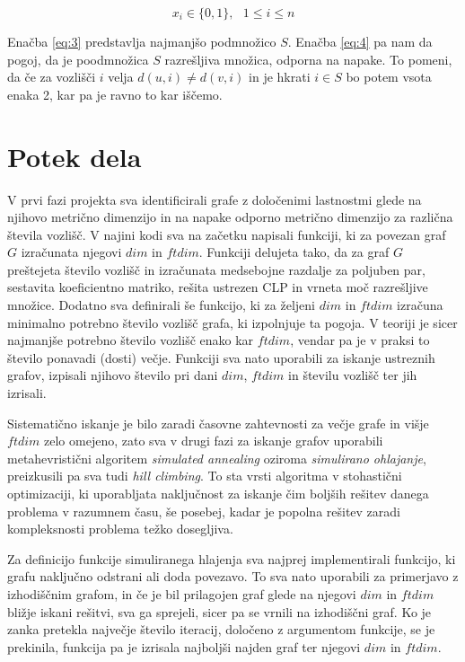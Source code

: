 \documentclass[12pt]{article}
\begin{document}
\begin{equation}
    x_i \in \{0, 1\}, \text{ } 1 \leq i \leq n
\label{eq:5}
\end{equation}

Enačba \eqref{eq:3} predstavlja najmanjšo podmnožico $S.$ Enačba \eqref{eq:4} pa nam da pogoj, da
je poodmnožica $S$ razrešljiva množica, odporna na napake. To pomeni, da če za vozlišči $i$ velja 
$d(u, i) \neq d(v, i)$ in je hkrati $i \in S$ bo potem vsota enaka 2, kar pa je ravno to kar iščemo.

\section{Potek dela}

V prvi fazi projekta sva identificirali grafe z določenimi lastnostmi glede na njihovo metrično 
dimenzijo in na napake odporno metrično dimenzijo za različna števila vozlišč. V najini kodi sva 
na začetku napisali funkciji, ki za povezan graf $G$ izračunata njegovi $dim$ in $ftdim$. Funkciji 
delujeta tako, da za graf $G$ preštejeta število vozlišč in izračunata medsebojne razdalje za poljuben 
par, sestavita koeficientno matriko, rešita ustrezen CLP in vrneta moč razrešljive množice. Dodatno 
sva definirali še funkcijo, ki za željeni $dim$ in $ftdim$ izračuna minimalno potrebno število 
vozlišč grafa, ki izpolnjuje ta pogoja. V teoriji je sicer najmanjše potrebno število vozlišč enako 
kar $ftdim$, vendar pa je v praksi to število ponavadi (dosti) večje. Funkciji sva nato uporabili za 
iskanje ustreznih grafov, izpisali njihovo število pri dani $dim$, $ftdim$ in številu vozlišč ter jih 
izrisali.

Sistematično iskanje je bilo zaradi časovne zahtevnosti za večje grafe in višje $ftdim$ zelo omejeno, 
zato sva v drugi fazi za iskanje grafov uporabili metahevristični algoritem \textit{simulated annealing} 
oziroma \textit{simulirano ohlajanje}, preizkusili pa sva tudi \textit{hill climbing}. To sta vrsti 
algoritma v stohastični optimizaciji, ki uporabljata naključnost za iskanje čim boljših rešitev danega 
problema v razumnem času, še posebej, kadar je popolna rešitev zaradi kompleksnosti problema težko dosegljiva. 

Za definicijo funkcije simuliranega hlajenja sva najprej implementirali funkcijo, ki grafu naključno odstrani ali 
doda povezavo. To sva nato uporabili za primerjavo z izhodiščnim grafom, in če je bil prilagojen graf glede na 
njegovi $dim$ in $ftdim$ bližje iskani rešitvi, sva ga sprejeli, sicer pa se vrnili na izhodiščni graf. Ko je 
zanka pretekla največje število iteracij, določeno z argumentom funkcije, se je prekinila, funkcija pa je izrisala 
najboljši najden graf ter njegovi $dim$ in $ftdim$.
\end{document}
